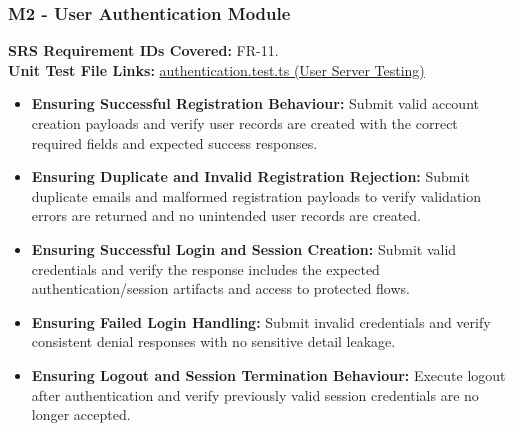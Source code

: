 \documentclass[12pt, titlepage]{article}
\begin{document}
\subsubsection{M2 - User Authentication Module}
\textbf{SRS Requirement IDs Covered:} FR-11.
\\
\textbf{Unit Test File Links:} \href{https://github.com/VirochaanRG/MES-Event-Management-System/blob/main/test/Server%20API%20Testing/User%20Server%20Testing/authentication.test.ts}{authentication.test.ts (User Server Testing)}
\begin{itemize}
  \item \textbf{Ensuring Successful Registration Behaviour:} Submit valid account creation payloads and verify user records are created with the correct required fields and expected success responses.
  \item \textbf{Ensuring Duplicate and Invalid Registration Rejection:} Submit duplicate emails and malformed registration payloads to verify validation errors are returned and no unintended user records are created.
  \item \textbf{Ensuring Successful Login and Session Creation:} Submit valid credentials and verify the response includes the expected authentication/session artifacts and access to protected flows.
  \item \textbf{Ensuring Failed Login Handling:} Submit invalid credentials and verify consistent denial responses with no sensitive detail leakage.
  \item \textbf{Ensuring Logout and Session Termination Behaviour:} Execute logout after authentication and verify previously valid session credentials are no longer accepted.
\end{itemize}
\end{document}
